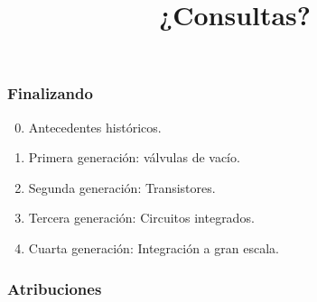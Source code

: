 \documentclass[11pt,a4paper,spanish]{beamer}
\begin{document}
\begin{frame}

    \frametitle{Finalizando}

\begin{enumerate}

    \setcounter{enumi}{-1}

    \item Antecedentes históricos.

    \item Primera generación: válvulas de vacío.

    \item Segunda generación: Transistores.

    \item Tercera generación: Circuitos integrados.

    \item Cuarta generación: Integración a gran escala.

\end{enumerate}

\end{frame}

\begin{frame}

\title{¿Consultas?}
\maketitle

\end{frame}

\begin{frame}%

\frametitle{Atribuciones}


\tiny

\end{frame}
\end{document}
